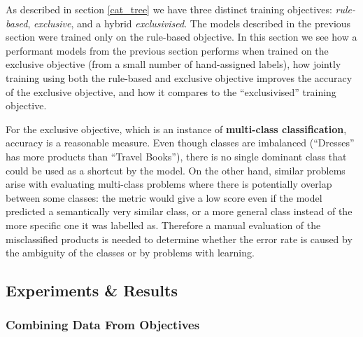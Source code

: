 As described in section \ref{cat_tree} we have three distinct training objectives: \textit{rule-based}, \textit{exclusive}, and a hybrid \textit{exclusivised}.
The models described in the previous section were trained only on the rule-based objective.
In this section we see how a performant models from the previous section performs when trained on the exclusive objective (from a small number of hand-assigned labels), how jointly training using both the rule-based and exclusive objective improves the accuracy of the exclusive objective, and how it compares to the ``exclusivised'' training objective.

For the exclusive objective, which is an instance of \textbf{multi-class classification}, accuracy is a reasonable measure.
Even though classes are imbalanced (``Dresses'' has more products than ``Travel Books''), there is no single dominant class that could be used as a shortcut by the model.
On the other hand, similar problems arise with evaluating multi-class problems where there is potentially overlap between some classes: the metric would give a low score even if the model predicted a semantically very similar class, or a more general class instead of the more specific one it was labelled as.
Therefore a manual evaluation of the misclassified products is needed to determine whether the error rate is caused by the ambiguity of the classes or by problems with learning.

\subsection{Experiments \& Results}

\subsubsection{Combining Data From Objectives}

